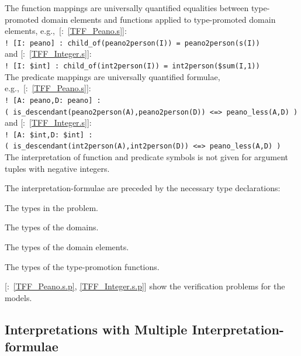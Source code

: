 \documentclass{ceurart}
\newcommand{\smalltt}[1]{\small \texttt{#1}}
\newcommand{\example}{{\scriptsize \faFile[regular]}}
\newenvironment{packed_itemize}{
\vspace*{-0.3em}
\begin{itemize}
\setlength{\partopsep}{0pt}
\setlength{\itemsep}{1pt}
\setlength{\parskip}{0pt}
\setlength{\parsep}{0pt}
}{\end{itemize}}
\begin{document}
The function mappings are universally quantified equalities between type-promoted domain 
elements and functions applied to type-promoted domain elements, 
e.g.,~[\example{}:~\ref{TFF_Peano.s}]:\\
\hspace*{0.5cm}\smalltt{! [I: peano] : child\_of(peano2person(I)) = peano2person(s(I))}\\
and [\example{}:~\ref{TFF_Integer.s}]:\\
\hspace*{0.5cm}\smalltt{! [I: \$int] : child\_of(int2person(I)) = int2person(\$sum(I,1))}\\
The predicate mappings are universally quantified formulae, 
e.g.,~[\example{}:~\ref{TFF_Peano.s}]:\\
\hspace*{0.5cm}\smalltt{! [A: peano,D: peano] :}\\
\hspace*{0.9cm}\smalltt{( is\_descendant(peano2person(A),peano2person(D)) <=> peano\_less(A,D) )}\\
and [\example{}:~\ref{TFF_Integer.s}]:\\
\hspace*{0.5cm}\smalltt{! [A: \$int,D: \$int] :}\\
\hspace*{0.9cm}\smalltt{( is\_descendant(int2person(A),int2person(D)) <=> peano\_less(A,D) )}\\
The interpretation of function and predicate symbols is not given for argument tuples
with negative integers.

The interpretation-formulae are preceded by the necessary type declarations:
\begin{packed_itemize}
\item The types in the problem.
\item The types of the domains.
\item The types of the domain elements.
\item The types of the type-promotion functions.
\end{packed_itemize}

[\example{}:~\ref{TFF_Peano.s.p}, \ref{TFF_Integer.s.p}] show the 
verification problems for the models.

\subsection{Interpretations with Multiple Interpretation-formulae}
\label{NewTarskianSplit}
\end{document}
